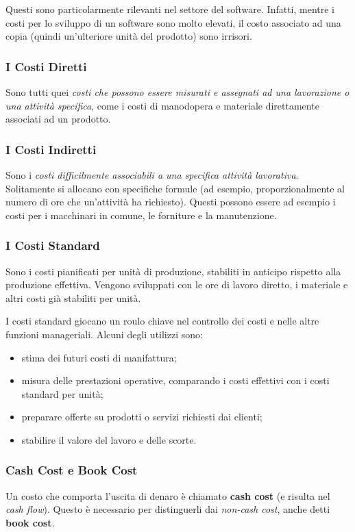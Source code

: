 \documentclass[a4paper,portrait,12pt]{article}
\theoremstyle{definition}
\begin{document}
Questi sono particolarmente rilevanti nel settore del software.
Infatti, mentre i costi per lo sviluppo di un software sono molto elevati, il costo associato ad una copia (quindi un'ulteriore unità del prodotto) sono irrisori.

\subsubsection{I Costi Diretti}
Sono tutti quei \emph{costi che possono essere misurati e assegnati ad una lavorazione o una attività specifica}, come i costi di manodopera e materiale direttamente associati ad un prodotto.

\subsubsection{I Costi Indiretti}
Sono i \emph{costi difficilmente associabili a una specifica attività lavorativa}.
Solitamente si allocano con specifiche formule (ad esempio, proporzionalmente al numero di ore che un'attività ha richiesto).
Questi possono essere ad esempio i costi per i macchinari in comune, le forniture e la manutenzione.

\subsubsection{I Costi Standard}
Sono i costi pianificati per unità di produzione, stabiliti in anticipo rispetto alla produzione effettiva.
Vengono sviluppati con le ore di lavoro diretto, i materiale e altri costi già stabiliti per unità.

I costi standard giocano un roulo chiave nel controllo dei costi e nelle altre funzioni manageriali.
Alcuni degli utilizzi sono:
\begin{itemize}
\item stima dei futuri costi di manifattura;
\item misura delle prestazioni operative, comparando i costi effettivi con i costi standard per unità;
\item preparare offerte su prodotti o servizi richiesti dai clienti;
\item stabilire il valore del lavoro e delle scorte.
\end{itemize}

\subsubsection{Cash Cost e Book Cost}
Un costo che comporta l'uscita di denaro è chiamato \textbf{cash cost} (e risulta nel \emph{cash flow}).
Questo è necessario per distinguerli dai \emph{non-cash cost}, anche detti \textbf{book cost}.
\end{document}
